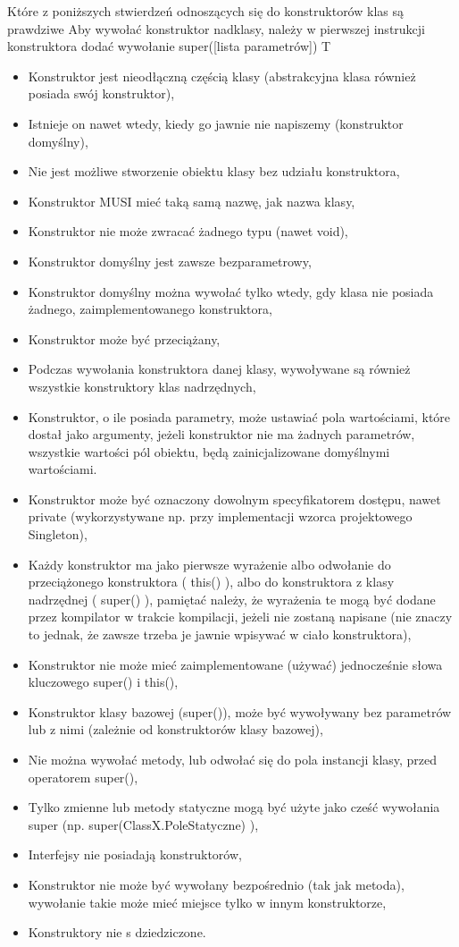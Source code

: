 \answer
{Które z poniższych stwierdzeń odnoszących się do konstruktorów klas są prawdziwe}
{Aby wywołać konstruktor nadklasy, należy w pierwszej instrukcji konstruktora dodać wywołanie super([lista parametrów])}
{T}
{
\begin{itemize}
	\item Konstruktor jest nieodłączną częścią klasy (abstrakcyjna klasa również posiada swój konstruktor),
	\item Istnieje on nawet wtedy, kiedy go jawnie nie napiszemy (konstruktor domyślny),
	\item Nie jest możliwe stworzenie obiektu klasy bez udziału konstruktora,
	\item Konstruktor MUSI mieć taką samą nazwę, jak nazwa klasy,
	\item Konstruktor nie może zwracać żadnego typu (nawet void),
	\item Konstruktor domyślny jest zawsze bezparametrowy,
	\item Konstruktor domyślny można wywołać tylko wtedy, gdy klasa nie posiada żadnego, zaimplementowanego konstruktora,
	\item Konstruktor może być przeciążany,
	\item Podczas wywołania konstruktora danej klasy, wywoływane są również wszystkie konstruktory klas nadrzędnych,
	\item Konstruktor, o ile posiada parametry, może ustawiać pola wartościami, które dostał jako argumenty, jeżeli konstruktor nie ma żadnych parametrów, wszystkie wartości pól obiektu, będą zainicjalizowane domyślnymi wartościami.
	\item Konstruktor może być oznaczony dowolnym specyfikatorem dostępu, nawet private (wykorzystywane np. przy implementacji wzorca projektowego Singleton),
	\item Każdy konstruktor ma jako pierwsze wyrażenie albo odwołanie do przeciążonego konstruktora ( this() ), albo do konstruktora z klasy nadrzędnej ( super() ), pamiętać należy, że wyrażenia te mogą być dodane przez kompilator w trakcie kompilacji, jeżeli nie zostaną napisane (nie znaczy to jednak, że zawsze trzeba je jawnie wpisywać w ciało konstruktora),
	\item Konstruktor nie może mieć zaimplementowane (używać) jednocześnie słowa kluczowego super() i this(), 
	\item Konstruktor klasy bazowej (super()), może być wywoływany bez parametrów lub z nimi (zależnie od konstruktorów klasy bazowej),
	\item Nie można wywołać metody, lub odwołać się do pola instancji klasy, przed operatorem super(),
	\item Tylko zmienne lub metody statyczne mogą być użyte jako cześć wywołania super (np. super(ClassX.PoleStatyczne) ),
	\item Interfejsy nie posiadają konstruktorów,
	\item Konstruktor nie może być wywołany bezpośrednio (tak jak metoda), wywołanie takie może mieć miejsce tylko w innym konstruktorze,
	\item Konstruktory nie s dziedziczone.
\end{itemize}
}
{}

